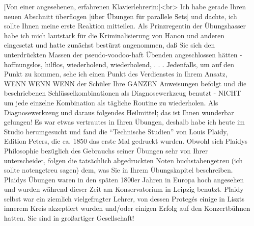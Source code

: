 \item \hypertarget{testimonials03}{}
[Von einer angesehenen, erfahrenen Klavierlehrerin:]<br>
Ich habe gerade Ihren neuen Abschnitt überflogen [über Übungen für parallele Sets] und dachte, ich sollte Ihnen meine erste Reaktion mitteilen.
Als Prinzregentin der Übungshasser habe ich mich lautstark für die Kriminalisierung von Hanon und anderen eingesetzt und hatte zunächst bestürzt angenommen, daß Sie sich den unterdrückten Massen der pseudo-voodoo-haft Übenden angeschlossen hätten - hoffnungslos, hilflos, wiederholend, wiederholend, . . .
Jedenfalls, um auf den Punkt zu kommen, sehe ich einen Punkt des Verdienstes in Ihrem Ansatz, WENN WENN WENN der Schüler Ihre GANZEN Anweisungen befolgt und die beschriebenen Schlüsselkombinationen als Diagnosewerkzeug benutzt - NICHT um jede einzelne Kombination als tägliche Routine zu wiederholen.
Als Diagnosewerkzeug und daraus folgendes Heilmittel; das ist Ihnen wunderbar gelungen!
Es war etwas vertrautes in Ihren Übungen, deshalb habe ich heute im Studio herumgesucht und fand die \enquote{Technische Studien} von Louis Plaidy, Edition Peters, die ca. 1850 das erste Mal gedruckt wurden.
Obwohl sich Plaidys Philosophie bezüglich des Gebrauchs seiner Übungen sehr von Ihrer unterscheidet, folgen die tatsächlich abgedruckten Noten buchstabengetreu (ich sollte notengetreu sagen) dem, was Sie in Ihrem Übungskapitel beschreiben.
Plaidys Übungen waren in den späten 1800er Jahren in Europa hoch angesehen und wurden während dieser Zeit am Konservatorium in Leipzig benutzt.
Plaidy selbst war ein ziemlich vielgefragter Lehrer, von dessen Protegés einige in Liszts innerem Kreis akzeptiert wurden und/oder einigen Erfolg auf den Konzertbühnen hatten.
Sie sind in großartiger Gesellschaft!


